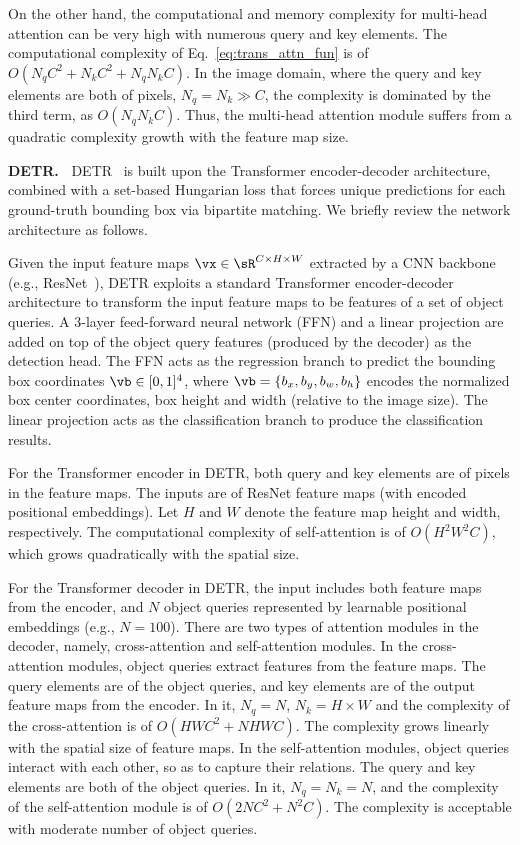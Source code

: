 On the other hand, the computational and memory complexity for multi-head attention can be very high with numerous query and key elements. The computational complexity of Eq.~\ref{eq:trans_attn_fun} is of $O(N_qC^2 + N_kC^2 + N_qN_kC)$. In the image domain, where the query and key elements are both of pixels, $N_q = N_k \gg C$, the complexity is dominated by the third term, as $O(N_qN_kC)$. Thus, the multi-head attention module suffers from a quadratic complexity growth with the feature map size.

\textbf{DETR.~} DETR~\citep{carion2020end} is built upon the Transformer encoder-decoder architecture, combined with a set-based Hungarian loss that forces unique predictions for each ground-truth bounding box via bipartite matching. We briefly review the network architecture as follows.


Given the input feature maps $\vx \in \sR^{C \times H \times W}$ extracted by a CNN backbone (e.g., ResNet~\citep{he2016deep}), DETR exploits a standard Transformer encoder-decoder architecture to transform the input feature maps to be features of a set of object queries. A 3-layer feed-forward neural network (FFN) and a linear projection are added on top of the object query features (produced by the decoder) as the detection head. The FFN acts as the regression branch to predict the bounding box coordinates $\vb \in [0, 1]^4$, where $\vb = \{b_x, b_y, b_w, b_h\}$ encodes the normalized box center coordinates, box height and width (relative to the image size). The linear projection acts as the classification branch to produce the classification results.



For the Transformer encoder in DETR, both query and key elements are of pixels in the feature maps. The inputs are of ResNet feature maps (with encoded positional embeddings). Let $H$ and $W$ denote the feature map height and width, respectively. The computational complexity of self-attention is of $O(H^2W^2C)$, which grows quadratically with the spatial size. 



For the Transformer decoder in DETR, the input includes both feature maps from the encoder, and $N$ object queries represented by learnable positional embeddings (e.g., $N = 100$). There are two types of attention modules in the decoder, namely, cross-attention and self-attention modules.
In the cross-attention modules, object queries extract features from the feature maps. The query elements are of the object queries, and key elements are of the output feature maps from the encoder. In it, $N_q = N$, $N_k = H\times W$ and the complexity of the cross-attention is of $O(HWC^2 + NHWC)$. The complexity grows linearly with the spatial size of feature maps. In the self-attention modules, object queries interact with each other, so as to capture their relations. The query and key elements are both of the object queries. In it, $N_q = N_k = N$, and the complexity of the self-attention module is of $O(2NC^2 + N^2C)$. The complexity is acceptable with moderate number of object queries.


